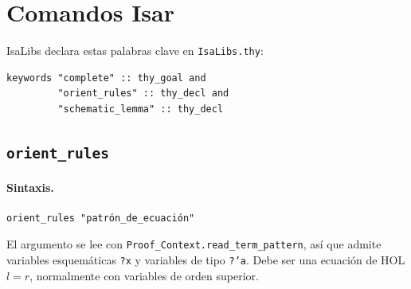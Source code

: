 \documentclass[11pt,a4paper]{article}
\newcommand{\isa}[1]{\texttt{#1}}
\theoremstyle{definition}
\theoremstyle{remark}
\begin{document}
\section{Comandos Isar}

IsaLibs declara estas palabras clave en \isa{IsaLibs.thy}:
\begin{lstlisting}
keywords "complete" :: thy_goal and
         "orient_rules" :: thy_decl and
         "schematic_lemma" :: thy_decl
\end{lstlisting}

\subsection{\texttt{orient\_rules}}
\label{sec:orient}

\paragraph{Sintaxis.}
\begin{lstlisting}
orient_rules "patrón_de_ecuación"
\end{lstlisting}
El argumento se lee con \isa{Proof\_Context.read\_term\_pattern}, así que admite
variables esquemáticas \isa{?x} y variables de tipo \isa{?'a}. Debe ser una
ecuación de HOL $l = r$, normalmente con variables de orden superior.
\end{document}
